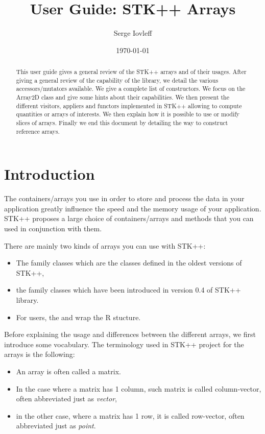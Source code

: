 \documentclass[a4paper,10pt]{article}
\title{ User Guide: STK++ Arrays}
\author{Serge Iovleff}
\date{\today}
\begin{document}


\maketitle
\begin{abstract}
This user guide gives a general review of the STK++ arrays and of their usages.
After giving a general review of the capability of the library, we detail the
various accessors/mutators available. We give a complete list of
constructors. We focus on the Array2D class and give some hints about their
capabilities. We then present the different visitors, appliers and functors
implemented in STK++ allowing to compute quantities or arrays of interests. We
then explain how it is possible to use or modify slices of arrays. Finally we end
this document by detailing the way to construct reference arrays.
\end{abstract}

\section{Introduction}

The containers/arrays you use in order to store and process the data in your
application greatly influence the speed and the memory usage of your application.
STK++ proposes a large choice of containers/arrays and methods that you can used
in conjunction with them.

There are mainly two kinds of arrays you can use with STK++:
\begin{itemize}
\item The  family classes which are the classes defined in the
oldest versions of STK++,
\item the  family classes which have been introduced in version
0.4 of STK++ library.
\item For \rtkore{} users, the  and  wrap the
R  stucture.
\end{itemize}

Before explaining the usage and differences between the different arrays,
we first introduce some vocabulary. The terminology used in STK++ project for
the arrays is the following:
\begin{itemize}
\item An array is often called a matrix.
\item In the case where a matrix has 1 column, such matrix is called
column-vector, often abbreviated just as \emph{vector},
\item in the other case, where a matrix has 1 row, it is called row-vector,
often abbreviated just as \emph{point}.
\end{itemize}
\end{document}
